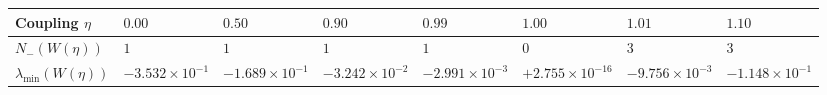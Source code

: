 \documentclass[
  11pt,
]{article}
\newcounter{none} %
\begin{document}
\begin{enumerate}
  {\def\LTcaptype{none} %
  \begin{longtable}[]{@{}
    >{\centering\arraybackslash}p{}
    >{\centering\arraybackslash}p{}
    >{\centering\arraybackslash}p{}
    >{\centering\arraybackslash}p{}
    >{\centering\arraybackslash}p{}
    >{\centering\arraybackslash}p{}
    >{\centering\arraybackslash}p{}
    >{\centering\arraybackslash}p{}@{}}
  \toprule\noalign{}
  \begin{minipage}[b]{\linewidth}\centering
  Coupling \(\eta\)
  \end{minipage} & \begin{minipage}[b]{\linewidth}\centering
  \(0.00\)
  \end{minipage} & \begin{minipage}[b]{\linewidth}\centering
  \(0.50\)
  \end{minipage} & \begin{minipage}[b]{\linewidth}\centering
  \(0.90\)
  \end{minipage} & \begin{minipage}[b]{\linewidth}\centering
  \(0.99\)
  \end{minipage} & \begin{minipage}[b]{\linewidth}\centering
  \textbf{\(1.00\)}
  \end{minipage} & \begin{minipage}[b]{\linewidth}\centering
  \(1.01\)
  \end{minipage} & \begin{minipage}[b]{\linewidth}\centering
  \(1.10\)
  \end{minipage} \\
  \midrule\noalign{}
  \endhead
  \bottomrule\noalign{}
  \endlastfoot
  \(N_-(W(\eta))\) & \(1\) & \(1\) & \(1\) & \(1\) & \textbf{\(0\)} &
  \(3\) & \(3\) \\
  \(\lambda_{\min}(W(\eta))\) & \(-3.532\times 10^{-1}\) &
  \(-1.689\times 10^{-1}\) & \(-3.242\times 10^{-2}\) &
  \(-2.991\times 10^{-3}\) & \textbf{\(+2.755\times 10^{-16}\)} &
  \(-9.756\times 10^{-3}\) & \(-1.148\times 10^{-1}\) \\
  \end{longtable}
  }


\end{enumerate}
\end{document}
